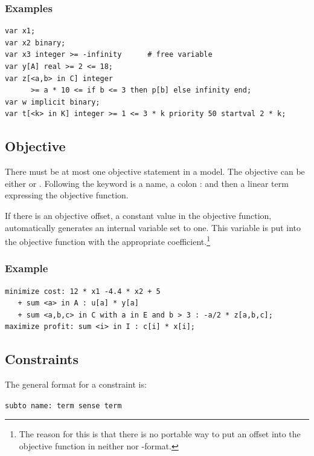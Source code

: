 \subsubsection{Examples}
{\small
\begin{verbatim}
var x1;
var x2 binary;
var x3 integer >= -infinity      # free variable
var y[A] real >= 2 <= 18;
var z[<a,b> in C] integer
      >= a * 10 <= if b <= 3 then p[b] else infinity end;
var w implicit binary;
var t[<k> in K] integer >= 1 <= 3 * k priority 50 startval 2 * k;
\end{verbatim}
}



\subsection{Objective}
There must be at most one objective statement in a model. The objective
can be either  or . Following the
keyword is a name, a colon : and then a linear term expressing the
objective function.

If there is an objective offset, \ie a constant value in the
objective function, \zimpl automatically generates an internal
variable  set to one. This variable is put into the
objective function with the appropriate coefficient.\footnote{The reason for
this is that there is no portable way to put an offset into the
objective function in neither \lpf nor \mps-format.}

\subsubsection{Example}
{\small
\begin{verbatim}
minimize cost: 12 * x1 -4.4 * x2 + 5
   + sum <a> in A : u[a] * y[a]
   + sum <a,b,c> in C with a in E and b > 3 : -a/2 * z[a,b,c];
maximize profit: sum <i> in I : c[i] * x[i];
\end{verbatim}
}

\subsection{Constraints}\label{ssec:ug:constraints}
The general format for a constraint is:

\smallskip
\verb|subto name: term sense term|

